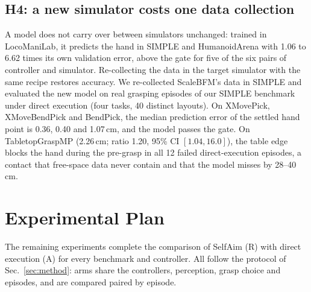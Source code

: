 \documentclass[conference]{IEEEtran}
\newcommand{\Ad}{\textsc{A}}       %
\newcommand{\Rr}{\textsc{R}}       %
\begin{document}
\subsection{H4: a new simulator costs one data collection}\label{sec:h4}
A model does not carry over between simulators unchanged: trained in LocoManiLab, it predicts the hand in SIMPLE and HumanoidArena with 1.06 to 6.62 times its own validation error, above the gate for five of the six pairs of controller and simulator. Re-collecting the data in the target simulator with the same recipe restores accuracy. We re-collected ScaleBFM's data in SIMPLE and evaluated the new model on real grasping episodes of our SIMPLE benchmark under direct execution (four tasks, 40 distinct layouts). On XMovePick, XMoveBendPick and BendPick, the median prediction error of the settled hand point is 0.36, 0.40 and 1.07\,cm, and the model passes the gate. On TabletopGraspMP (2.26\,cm; ratio 1.20, 95\% CI $[1.04,16.0]$), the table edge blocks the hand during the pre-grasp in all 12 failed direct-execution episodes, a contact that free-space data never contain and that the model misses by 28--40\,cm.

\section{Experimental Plan}\label{sec:plan}
The remaining experiments complete the comparison of SelfAim (\Rr) with direct execution (\Ad) for every benchmark and controller. All follow the protocol of Sec.~\ref{sec:method}: arms share the controllers, perception, grasp choice and episodes, and are compared paired by episode.
\end{document}
